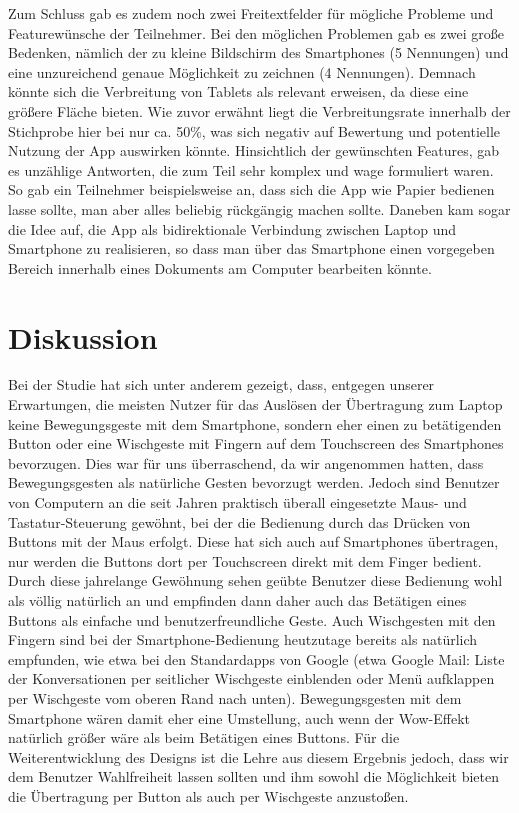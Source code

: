 \documentclass{chi-ext}
\begin{document}
Zum Schluss gab es zudem noch zwei Freitextfelder für mögliche Probleme und Featurewünsche der Teilnehmer. Bei den möglichen Problemen gab es zwei große Bedenken, nämlich der zu kleine Bildschirm des Smartphones (5 Nennungen) und eine unzureichend genaue Möglichkeit zu zeichnen (4 Nennungen). Demnach könnte sich die Verbreitung von Tablets als relevant erweisen, da diese eine größere Fläche bieten. Wie zuvor erwähnt liegt die Verbreitungsrate innerhalb der Stichprobe hier bei nur ca. 50\%, was sich negativ auf Bewertung und potentielle Nutzung der App auswirken könnte.
Hinsichtlich der gewünschten Features, gab es unzählige Antworten, die zum Teil sehr komplex und wage formuliert waren. So gab ein Teilnehmer beispielsweise an, dass sich die App wie Papier bedienen lasse sollte, man aber alles beliebig rückgängig machen sollte. Daneben kam sogar die Idee auf, die App als bidirektionale Verbindung zwischen Laptop und Smartphone zu realisieren, so dass man über das Smartphone einen vorgegeben Bereich innerhalb eines Dokuments am Computer bearbeiten könnte.


\section{Diskussion}
Bei der Studie hat sich unter anderem gezeigt, dass, entgegen unserer Erwartungen, die meisten Nutzer für das Auslösen der Übertragung zum Laptop keine Bewegungsgeste mit dem Smartphone, sondern eher einen zu betätigenden Button oder eine Wischgeste mit Fingern auf dem Touchscreen des Smartphones bevorzugen. Dies war für uns überraschend, da wir angenommen hatten, dass Bewegungsgesten als natürliche Gesten bevorzugt werden. Jedoch sind Benutzer von Computern an die seit Jahren praktisch überall eingesetzte Maus- und Tastatur-Steuerung gewöhnt, bei der die Bedienung durch das Drücken von Buttons mit der Maus erfolgt. Diese hat sich auch auf Smartphones übertragen, nur werden die Buttons dort per Touchscreen direkt mit dem Finger bedient. Durch diese jahrelange Gewöhnung sehen geübte Benutzer diese Bedienung wohl als völlig natürlich an und empfinden dann daher auch das Betätigen eines Buttons als einfache und benutzerfreundliche Geste. Auch Wischgesten mit den Fingern sind bei der Smartphone-Bedienung heutzutage bereits als natürlich empfunden, wie etwa bei den Standardapps von Google (etwa Google Mail: Liste der Konversationen per seitlicher Wischgeste einblenden oder Menü aufklappen per Wischgeste vom oberen Rand nach unten).
Bewegungsgesten mit dem Smartphone wären damit eher eine Umstellung, auch wenn der Wow-Effekt natürlich größer wäre als beim Betätigen eines Buttons. Für die Weiterentwicklung des Designs ist die Lehre aus diesem Ergebnis jedoch, dass wir dem Benutzer Wahlfreiheit lassen sollten und ihm sowohl die Möglichkeit bieten die Übertragung per Button als auch per Wischgeste anzustoßen. 
\end{document}
